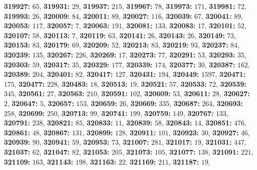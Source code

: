\textsf{\bfseries 319927:} $65$, \textsf{\bfseries 319931:} $29$, \textsf{\bfseries 319937:} $215$, \textsf{\bfseries 319967:} $78$, \textsf{\bfseries 319973:} $171$, \textsf{\bfseries 319981:} $72$, \textsf{\bfseries 319993:} $26$, \textsf{\bfseries 320009:} $84$, \textsf{\bfseries 320011:} $89$, \textsf{\bfseries 320027:} $116$, \textsf{\bfseries 320039:} $67$, \textsf{\bfseries 320041:} $89$, \textsf{\bfseries 320053:} $117$, \textsf{\bfseries 320057:} $7$, \textsf{\bfseries 320063:} $191$, \textsf{\bfseries 320081:} $133$, \textsf{\bfseries 320083:} $17$, \textsf{\bfseries 320101:} $52$, \textsf{\bfseries 320107:} $58$, \textsf{\bfseries 320113:} $7$, \textsf{\bfseries 320119:} $63$, \textsf{\bfseries 320141:} $26$, \textsf{\bfseries 320143:} $26$, \textsf{\bfseries 320149:} $73$, \textsf{\bfseries 320153:} $83$, \textsf{\bfseries 320179:} $69$, \textsf{\bfseries 320209:} $52$, \textsf{\bfseries 320213:} $83$, \textsf{\bfseries 320219:} $93$, \textsf{\bfseries 320237:} $84$, \textsf{\bfseries 320239:} $135$, \textsf{\bfseries 320267:} $226$, \textsf{\bfseries 320269:} $17$, \textsf{\bfseries 320273:} $77$, \textsf{\bfseries 320291:} $53$, \textsf{\bfseries 320293:} $35$, \textsf{\bfseries 320303:} $59$, \textsf{\bfseries 320317:} $35$, \textsf{\bfseries 320329:} $177$, \textsf{\bfseries 320339:} $174$, \textsf{\bfseries 320377:} $30$, \textsf{\bfseries 320387:} $162$, \textsf{\bfseries 320389:} $204$, \textsf{\bfseries 320401:} $82$, \textsf{\bfseries 320417:} $127$, \textsf{\bfseries 320431:} $194$, \textsf{\bfseries 320449:} $1597$, \textsf{\bfseries 320471:} $175$, \textsf{\bfseries 320477:} $228$, \textsf{\bfseries 320483:} $18$, \textsf{\bfseries 320513:} $19$, \textsf{\bfseries 320521:} $57$, \textsf{\bfseries 320533:} $72$, \textsf{\bfseries 320539:} $345$, \textsf{\bfseries 320561:} $27$, \textsf{\bfseries 320563:} $210$, \textsf{\bfseries 320591:} $102$, \textsf{\bfseries 320609:} $53$, \textsf{\bfseries 320611:} $28$, \textsf{\bfseries 320627:} $2$, \textsf{\bfseries 320647:} $5$, \textsf{\bfseries 320657:} $153$, \textsf{\bfseries 320659:} $26$, \textsf{\bfseries 320669:} $335$, \textsf{\bfseries 320687:} $264$, \textsf{\bfseries 320693:} $258$, \textsf{\bfseries 320699:} $250$, \textsf{\bfseries 320713:} $99$, \textsf{\bfseries 320741:} $199$, \textsf{\bfseries 320759:} $149$, \textsf{\bfseries 320767:} $133$, \textsf{\bfseries 320791:} $238$, \textsf{\bfseries 320821:} $85$, \textsf{\bfseries 320833:} $11$, \textsf{\bfseries 320839:} $58$, \textsf{\bfseries 320843:} $14$, \textsf{\bfseries 320851:} $476$, \textsf{\bfseries 320861:} $48$, \textsf{\bfseries 320867:} $131$, \textsf{\bfseries 320899:} $128$, \textsf{\bfseries 320911:} $101$, \textsf{\bfseries 320923:} $30$, \textsf{\bfseries 320927:} $46$, \textsf{\bfseries 320939:} $90$, \textsf{\bfseries 320941:} $59$, \textsf{\bfseries 320953:} $73$, \textsf{\bfseries 321007:} $281$, \textsf{\bfseries 321017:} $19$, \textsf{\bfseries 321031:} $447$, \textsf{\bfseries 321037:} $62$, \textsf{\bfseries 321047:} $82$, \textsf{\bfseries 321053:} $205$, \textsf{\bfseries 321073:} $105$, \textsf{\bfseries 321077:} $138$, \textsf{\bfseries 321091:} $221$, \textsf{\bfseries 321109:} $163$, \textsf{\bfseries 321143:} $198$, \textsf{\bfseries 321163:} $22$, \textsf{\bfseries 321169:} $211$, \textsf{\bfseries 321187:} $19$, 
